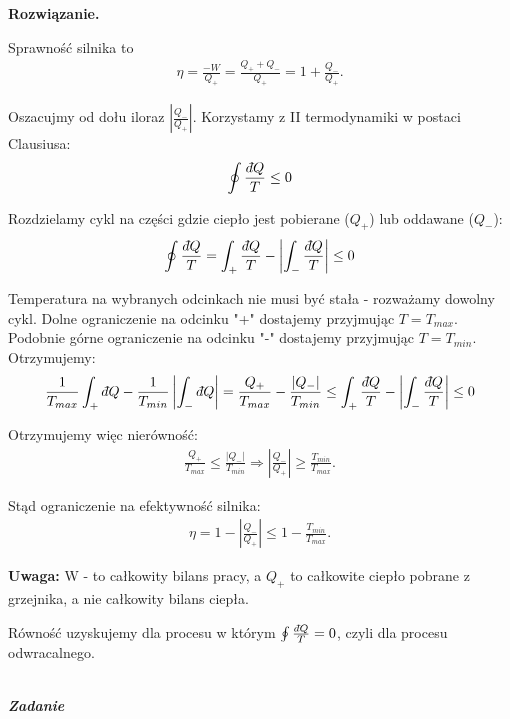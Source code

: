 \documentclass[11pt,a4paper]{article}
\newcommand{\dbar} {\ensuremath{\,\mathchar'26\mkern-12mu d}}
\newcounter{zadanie}\newcommand{\zadanie}[1][]{\addtocounter{zadanie}{1} ~\\ {\bf \emph{Zadanie \arabic{zadanie} #1 }} \\}
\newenvironment{solution}{\vspace{1cm} \par\textbf{Rozwiązanie.} \vspace{1cm}}{}
\begin{document}
\begin{solution}

Sprawność silnika to
\begin{align*}
  \eta = \frac{-W}{Q_{+}} = \frac{Q_{+} + Q_{-}}{Q_{+}} = 
          1 + \frac{Q_{-}}{Q_{+}}.
\end{align*}

Oszacujmy od dołu iloraz $|\frac{Q_{-}}{Q_{+}}|$. 
Korzystamy z II termodynamiki w postaci Clausiusa:
\begin{align*}
  \oint \frac{\dbar Q}{T} \leq 0 
\end{align*}

Rozdzielamy cykl na części gdzie ciepło jest pobierane ($Q_{+}$) 
lub oddawane ($Q_{-}$):
\begin{align*}
  \oint \frac{\dbar Q}{T} = \int_{+} \frac{\dbar Q}{T} - 
   \left| \int_{-} \frac{\dbar Q}{T} \right| \leq 0
\end{align*}

Temperatura na wybranych odcinkach nie musi być stała - rozważamy
dowolny cykl. Dolne ograniczenie na odcinku "+"
dostajemy przyjmując $T = T_{max}$. Podobnie górne ograniczenie na odcinku "-"
dostajemy przyjmując $T = T_{min}$. Otrzymujemy:
\begin{align*}
  \frac{1}{T_{max}} \int_{+} \dbar Q - 
  \frac{1}{T_{min}} \left| \int_{-} \dbar Q \right| =
  \frac{Q_{+}}{T_{max}} - \frac{|Q_{-}|}{T_{min}} \leq
  \int_{+} \frac{\dbar Q}{T} - \left|\int_{-} \frac{\dbar Q}{T} \right| \leq 0
\end{align*}

Otrzymujemy więc nierówność:
\begin{align*}
  \frac{Q_{+}}{T_{max}} \leq \frac{|Q_{-}|}{T_{min}} \Rightarrow 
  \left| \frac{Q_{-}}{Q_{+}} \right| \geq \frac{T_{min}}{T_{max}}.
\end{align*}

Stąd ograniczenie na efektywność silnika:
\begin{align*}
  \eta = 1 - \left|\frac{Q_{-}}{Q_{+}} \right| \leq 1 - \frac{T_{min}}{T_{max}}.
\end{align*}

{\bf Uwaga:} W - to całkowity bilans pracy, a 
$Q_{+}$ to całkowite ciepło pobrane z grzejnika, a nie całkowity bilans ciepła. 

Równość uzyskujemy dla procesu w którym $\oint \frac{\dbar Q}{T} = 0$, czyli 
dla procesu odwracalnego.


\newpage   
\end{solution}
\zadanie[]
\end{document}
